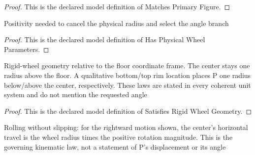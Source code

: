 \begin{proof}
  This is the declared model definition of Matches Primary Figure.
\end{proof}
\begin{definition}
  \label{def:physics:phyx-mini-0736:phyxminiproblems-problemphyxmini0736-hasphysicalwheelparameters}
  Positivity needed to cancel the physical radius and select the angle branch
\end{definition}
\begin{proof}
  This is the declared model definition of Has Physical Wheel Parameters.
\end{proof}
\begin{definition}
  \label{def:physics:phyx-mini-0736:phyxminiproblems-problemphyxmini0736-satisfiesrigidwheelgeometry}
  Rigid-wheel geometry relative to the floor coordinate frame. The center stays one radius above the floor. A qualitative bottom/top rim location places P one radius below/above the center, respectively. These laws are stated in every coherent unit system and do not mention the requested angle
\end{definition}
\begin{proof}
  This is the declared model definition of Satisfies Rigid Wheel Geometry.
\end{proof}
\begin{definition}
  \label{def:physics:phyx-mini-0736:phyxminiproblems-problemphyxmini0736-satisfiesrollingwithoutslipping}
  Rolling without slipping: for the rightward motion shown, the center's horizontal travel is the wheel radius times the positive rotation magnitude. This is the governing kinematic law, not a statement of P's displacement or its angle
\end{definition}
